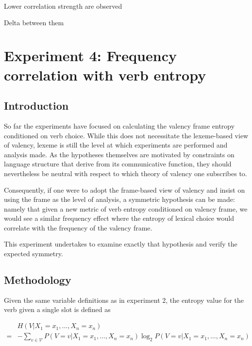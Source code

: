 
Lower correlation strength are observed


Delta between them 


\section{Experiment 4: Frequency correlation with verb entropy}\label{sec:exp4-verb-entropy}

\subsection{Introduction}

So far the experiments have focused on calculating the valency frame entropy conditioned on verb choice. While this does not necessitate the lexeme-based view of valency, lexeme is still the level at which experiments are performed and analysis made. As the hypotheses themselves are motivated by constraints on language structure that derive from its communicative function, they should nevertheless be neutral with respect to which theory of valency one subscribes to. 

Consequently, if one were to adopt the frame-based view of valency and insist on using the frame as the level of analysis, a symmetric hypothesis can be made: namely that given a new metric of verb entropy conditioned on valency frame, we would see a similar frequency effect where the entropy of lexical choice would correlate with the frequency of the valency frame. 

This experiment undertakes to examine exactly that hypothesis and verify the expected symmetry.

\subsection{Methodology}

Given the same variable definitions as in experiment 2, the entropy value for the verb given a single slot is defined as

\begin{equation*}
  \begin{split}
   & H(V|X_1=x_1,\ldots,X_n=x_n)  \\
  =&-\sum\limits_{v\in{}\mathcal{V}}{P(V=v|X_1=x_1,\ldots,X_n=x_n)\log_2P(V=v|X_1=x_1,\ldots,X_n=x_n)}
  \end{split}
\end{equation*}


